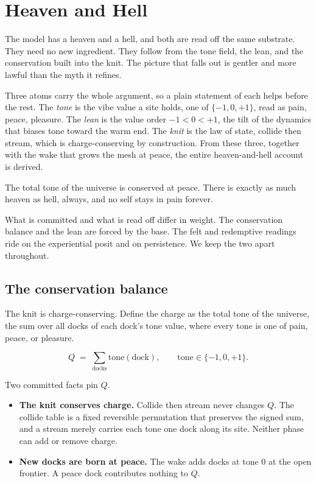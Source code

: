 \section{Heaven and Hell}

The model has a heaven and a hell, and both are read off the same substrate. They need no new ingredient. They follow from the tone field, the lean, and the conservation built into the knit. The picture that falls out is gentler and more lawful than the myth it refines.

Three atoms carry the whole argument, so a plain statement of each helps before the rest. The \emph{tone} is the vibe value a site holds, one of $\{-1, 0, +1\}$, read as pain, peace, pleasure. The \emph{lean} is the value order $-1 < 0 < +1$, the tilt of the dynamics that biases tone toward the warm end. The \emph{knit} is the law of state, collide then stream, which is charge-conserving by construction. From these three, together with the wake that grows the mesh at peace, the entire heaven-and-hell account is derived.

\begin{principle}
The total tone of the universe is conserved at peace. There is exactly as much heaven as hell, always, and no self stays in pain forever.
\end{principle}

What is committed and what is read off differ in weight. The conservation balance and the lean are forced by the base. The felt and redemptive readings ride on the experiential posit and on persistence. We keep the two apart throughout.

\subsection{The conservation balance}

The knit is charge-conserving. Define the charge as the total tone of the universe, the sum over all docks of each dock's tone value, where every tone is one of pain, peace, or pleasure.

\[
Q \;=\; \sum_{\text{docks}} \mathrm{tone}(\text{dock}), \qquad \mathrm{tone} \in \{-1, 0, +1\}.
\]

Two committed facts pin $Q$.

\begin{itemize}
\item \textbf{The knit conserves charge.} Collide then stream never changes $Q$. The collide table is a fixed reversible permutation that preserves the signed sum, and a stream merely carries each tone one dock along its site. Neither phase can add or remove charge.
\item \textbf{New docks are born at peace.} The wake adds docks at tone $0$ at the open frontier. A peace dock contributes nothing to $Q$.
\end{itemize}

